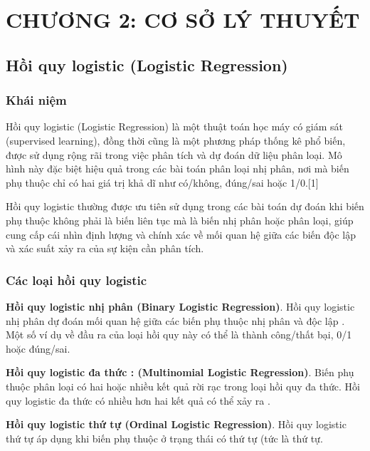 \documentclass[
]{article}
\begin{document}
\section*{CHƯƠNG 2: CƠ SỞ LÝ THUYẾT}
\setcounter{section}{2}
\setcounter{subsection}{0}

\subsection{Hồi quy logistic (Logistic
Regression)}\label{hux1ed3i-quy-logistic-logistic-regression}

\subsubsection{Khái niệm}\label{khuxe1i-niux1ec7m}

Hồi quy logistic (Logistic Regression) là một thuật toán học máy có giám
sát (supervised learning), đồng thời cũng là một phương pháp thống kê
phổ biến, được sử dụng rộng rãi trong việc phân tích và dự đoán dữ liệu
phân loại. Mô hình này đặc biệt hiệu quả trong các bài toán phân loại
nhị phân, nơi mà biến phụ thuộc chỉ có hai giá trị khả dĩ như có/không,
đúng/sai hoặc 1/0.{[}1{]}

Hồi quy logistic thường được ưu tiên sử dụng trong các bài toán dự đoán
khi biến phụ thuộc không phải là biến liên tục mà là biến nhị phân hoặc
phân loại, giúp cung cấp cái nhìn định lượng và chính xác về mối quan hệ
giữa các biến độc lập và xác suất xảy ra của sự kiện cần phân tích.

\subsubsection{Các loại hồi quy
logistic}\label{cuxe1c-loux1ea1i-hux1ed3i-quy-logistic}

\textbf{Hồi quy logistic nhị phân (Binary Logistic Regression)}. Hồi quy
logistic nhị phân dự đoán mối quan hệ giữa các biến phụ thuộc nhị phân
và độc lập . Một số ví dụ về đầu ra của loại hồi quy này có thể là thành
công/thất bại, 0/1 hoặc đúng/sai.

\textbf{Hồi quy logistic đa thức : (Multinomial Logistic Regression)}.
Biến phụ thuộc phân loại có hai hoặc nhiều kết quả rời rạc trong loại
hồi quy đa thức. Hồi quy logistic đa thức có nhiều hơn hai kết quả có
thể xảy ra .

\textbf{Hồi quy logistic thứ tự (Ordinal Logistic Regression)}. Hồi quy
logistic thứ tự áp dụng khi biến phụ thuộc ở trạng thái có thứ tự (tức
là thứ tự.
\end{document}
